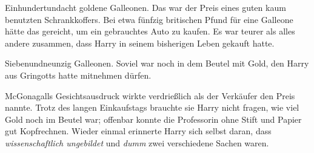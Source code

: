 Einhundertundacht goldene Galleonen. Das war der Preis eines guten kaum benutzten Schrankkoffers. Bei etwa fünfzig britischen Pfund für eine Galleone hätte das gereicht, um ein gebrauchtes Auto zu kaufen. Es war teurer als alles andere zusammen, dass Harry in seinem bisherigen Leben gekauft hatte.

Siebenundneunzig Galleonen. Soviel war noch in dem Beutel mit Gold, den Harry aus Gringotts hatte mitnehmen dürfen.

McGonagalls Gesichtsausdruck wirkte verdrießlich als der Verkäufer den Preis nannte. Trotz des langen Einkaufstags brauchte sie Harry nicht fragen, wie viel Gold noch im Beutel war; offenbar konnte die Professorin ohne Stift und Papier gut Kopfrechnen. Wieder einmal erinnerte Harry sich selbst daran, dass \emph{wissenschaftlich ungebildet} und \emph{dumm} zwei verschiedene Sachen waren.

